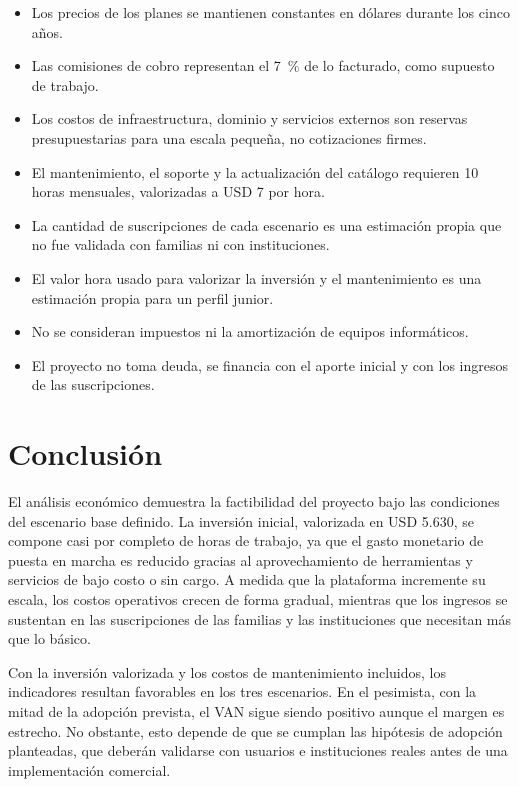 \begin{itemize}
    \item Los precios de los planes se mantienen constantes en dólares durante los cinco años.
    \item Las comisiones de cobro representan el 7~\% de lo facturado, como supuesto de trabajo.
    \item Los costos de infraestructura, dominio y servicios externos son reservas presupuestarias para una escala pequeña, no cotizaciones firmes.
    \item El mantenimiento, el soporte y la actualización del catálogo requieren 10 horas mensuales, valorizadas a USD 7 por hora.
    \item La cantidad de suscripciones de cada escenario es una estimación propia que no fue validada con familias ni con instituciones.
    \item El valor hora usado para valorizar la inversión y el mantenimiento es una estimación propia para un perfil junior.
    \item No se consideran impuestos ni la amortización de equipos informáticos.
    \item El proyecto no toma deuda, se financia con el aporte inicial y con los ingresos de las suscripciones.
\end{itemize}

\section{Conclusión}

El análisis económico demuestra la factibilidad del proyecto bajo las condiciones del escenario base definido. La inversión inicial, valorizada en USD 5.630, se compone casi por completo de horas de trabajo, ya que el gasto monetario de puesta en marcha es reducido gracias al aprovechamiento de herramientas y servicios de bajo costo o sin cargo. A medida que la plataforma incremente su escala, los costos operativos crecen de forma gradual, mientras que los ingresos se sustentan en las suscripciones de las familias y las instituciones que necesitan más que lo básico.

Con la inversión valorizada y los costos de mantenimiento incluidos, los indicadores resultan favorables en los tres escenarios. En el pesimista, con la mitad de la adopción prevista, el VAN sigue siendo positivo aunque el margen es estrecho. No obstante, esto depende de que se cumplan las hipótesis de adopción planteadas, que deberán validarse con usuarios e instituciones reales antes de una implementación comercial.

